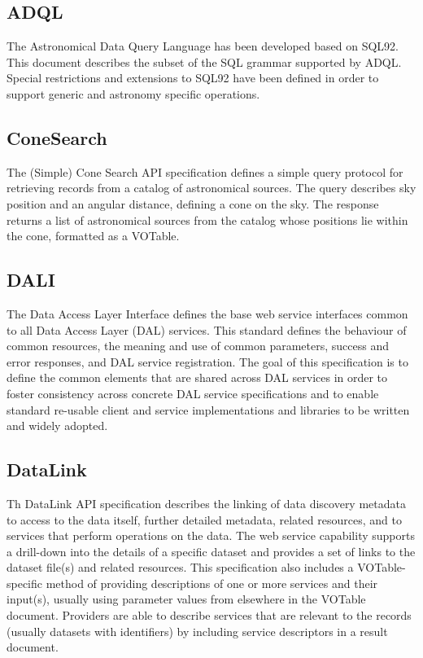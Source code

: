 \documentclass[11pt,a4paper]{ivoa}
\begin{document}
\subsection{ADQL}

The Astronomical Data Query Language has been developed based on SQL92. This document 
describes the subset of the SQL grammar supported by ADQL. Special restrictions and 
extensions to SQL92 have been defined in order to support generic and astronomy 
specific operations. 

\subsection{ConeSearch}

The (Simple) Cone Search API specification defines a simple query protocol for retrieving 
records from a catalog of astronomical sources. The query describes sky position and an 
angular distance, defining a cone on the sky. The response returns a list of astronomical 
sources from the catalog whose positions lie within the cone, formatted as a VOTable. 

\subsection{DALI}

The Data Access Layer Interface defines the base web service interfaces common to all Data 
Access Layer (DAL) services. This standard defines the behaviour of common resources, the 
meaning and use of common parameters, success and error responses, and DAL service 
registration. The goal of this specification is to define the common elements that are 
shared across DAL services in order to foster consistency across concrete DAL service 
specifications and to enable standard re-usable client and service implementations and 
libraries to be written and widely adopted. 

\subsection{DataLink}

Th DataLink API specification describes the linking of data discovery metadata to access to 
the data itself, further detailed metadata, related resources, and to services that perform 
operations on the data. The web service capability supports a drill-down into the details 
of a specific dataset and provides a set of links to the dataset file(s) and related resources. 
This specification also includes a VOTable-specific method of providing descriptions of one 
or more services and their input(s), usually using parameter values from elsewhere in the 
VOTable document. Providers are able to describe services that are relevant to the records 
(usually datasets with identifiers) by including service descriptors in a result document. 
\end{document}

